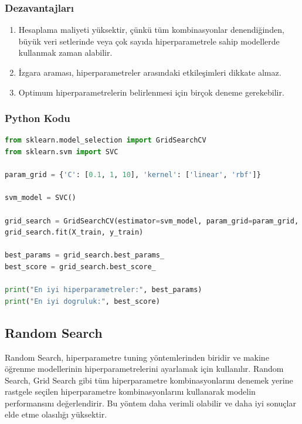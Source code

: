 \subsubsection{Dezavantajları}
\begin{enumerate}
    \item Hesaplama maliyeti yüksektir, çünkü tüm kombinasyonlar denendiğinden, büyük veri setlerinde veya çok sayıda hiperparametrele sahip modellerde kullanmak zaman alabilir.
    \item İzgara araması, hiperparametreler arasındaki etkileşimleri dikkate almaz.
    \item Optimum hiperparametrelerin belirlenmesi için birçok deneme gerekebilir.
\end{enumerate}

\subsubsection{Python Kodu}

\begin{lstlisting}[language=Python]
from sklearn.model_selection import GridSearchCV
from sklearn.svm import SVC

param_grid = {'C': [0.1, 1, 10], 'kernel': ['linear', 'rbf']}

svm_model = SVC()

grid_search = GridSearchCV(estimator=svm_model, param_grid=param_grid, cv=5, scoring='accuracy')
grid_search.fit(X_train, y_train)

best_params = grid_search.best_params_
best_score = grid_search.best_score_

print("En iyi hiperparametreler:", best_params)
print("En iyi dogruluk:", best_score)
\end{lstlisting}

\newpage

\subsection{Random Search}
Random Search, hiperparametre tuning yöntemlerinden biridir ve makine öğrenme modellerinin hiperparametrelerini ayarlamak için kullanılır. Random Search, Grid Search gibi tüm hiperparametre kombinasyonlarını denemek yerine rastgele seçilen hiperparametre kombinasyonlarını kullanarak modelin performansını değerlendirir. Bu yöntem daha verimli olabilir ve daha iyi sonuçlar elde etme olasılığı yüksektir.

